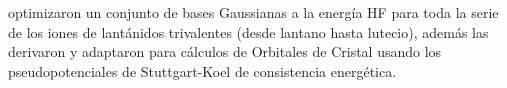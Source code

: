 \cite{Yang2005} optimizaron un conjunto de bases Gaussianas a la 
energ\'ia HF para toda la serie de los iones de lant\'anidos
trivalentes (desde lantano hasta lutecio), adem\'as las derivaron y 
adaptaron para c\'alculos de Orbitales de Cristal usando los 
pseudopotenciales de Stuttgart-Koel de consistencia energ\'etica. 

%
